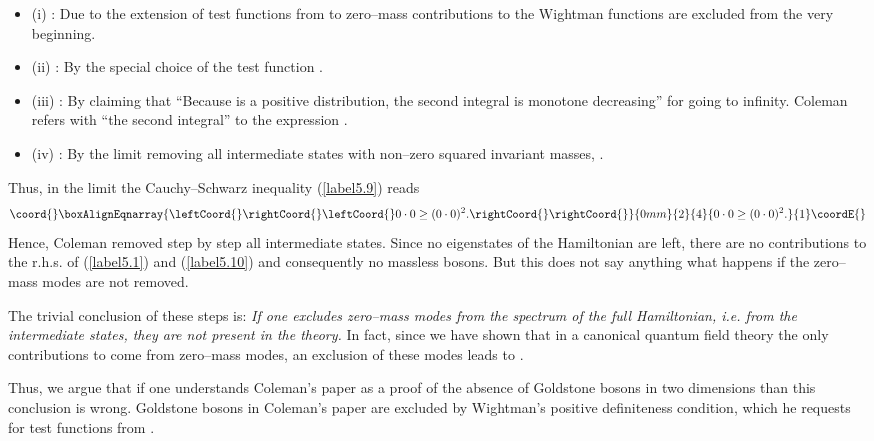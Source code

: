 \documentclass[a4paper,12pt] {article}
\begin{document}
\begin{itemize}
\item (i) \coordHE{}: Due to the extension of test functions from
\coordHE{} to \coordHE{}
zero--mass contributions to the Wightman functions are excluded from
the very beginning.
\item (ii) \coordHE{}: By the special choice of the test function \coordHE{}.
\item (iii) \coordHE{}: By claiming that ``Because \coordHE{} is
a positive distribution, the second integral is monotone decreasing''
for \myHighlight{$\lambda$}\coordHE{} going to infinity. Coleman refers with ``the second
integral'' to the expression \coordHE{}.
\item (iv) \coordHE{}: By the limit \myHighlight{$\lambda \to \infty$}\coordHE{}
removing all intermediate states with non--zero squared invariant
masses, \coordHE{}. 
\end{itemize}

Thus, in the limit \myHighlight{$\lambda \to \infty$}\coordHE{} the Cauchy--Schwarz inequality
(\ref{label5.9}) reads
%
\begin{eqnarray}\coord{}\boxAlignEqnarray{\leftCoord{}\rightCoord{}\label{label5.10}
\leftCoord{}0\cdot0 \ge (0\cdot 0)^2 . \rightCoord{}
\rightCoord{}}{0mm}{2}{4}{0\cdot0 \ge (0\cdot 0)^2 . 
}{1}\coordE{}\end{eqnarray}
%
Hence, Coleman removed step by step all intermediate states. Since no
eigenstates of the Hamiltonian are left, there are no contributions to
the r.h.s. of (\ref{label5.1}) and (\ref{label5.10}) and consequently
no massless bosons.  But this does not say anything what happens if the
zero--mass modes are not removed.

The trivial conclusion of these steps is: {\it If one excludes
zero--mass modes from the spectrum of the full Hamiltonian, i.e. from
the intermediate states, they are not present in the theory.} In fact,
since we have shown that in a canonical quantum field theory the only
contributions to \coordHE{} come from zero--mass modes, an
exclusion of these modes leads to \coordHE{}.

Thus, we argue that if one understands Coleman's paper as a proof of
the absence of Goldstone bosons in two dimensions than this conclusion
is wrong.  Goldstone bosons in Coleman's paper are excluded by
Wightman's positive definiteness condition, which he requests for test
functions from \coordHE{}.
\end{document}
